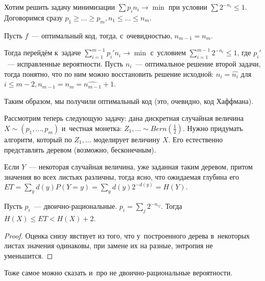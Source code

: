 \documentclass{article}
\begin{document}
Хотим решить задачу минимизации $\sum p_i n_i \rightarrow \min$ при условии
$\sum 2^{-n_i} \le 1$. Договоримся сразу $p_1 \ge \ldots \ge p_m, n_1 \le \ldots
\le n_m$.

\begin{claim}
	Пусть $f$~--- оптимальный код, тогда, с~очевидностью, $n_{m-1} = n_m$.
\end{claim}

Тогда перейдём к~задаче $\sum\limits_{i=1}^{m-1} p_i' {n_i} \rightarrow \min$
с~условием $\sum\limits_{i=1}^{m-1} 2^{-n_i} \le 1$, где $p_i'$~--- исправленные
вероятности. Пусть $\hat{n_i}$~--- оптимальное решение второй задачи, тогда
понятно, что по ним можно восстановить решение исходной: $n_i = \hat{n_i}$ для
$i \le m - 2, n_{m-1} = n_m = \hat{n_{m-1}} + 1$.

Таким образом, мы получили оптимальный код (это, очевидно, код Хаффмана).

Рассмотрим теперь следующую задачу: дана дискретная случайная величина $X \sim
(p_1, \ldots, p_m)$ и~честная монетка: $Z_1, \ldots \sim
Bern\left(\frac{1}{2}\right)$. Нужно придумать алгоритм, который по $Z_1,
\ldots$ моделирует величину $X$. Его естественно представлять деревом (возможно,
бесконечным).

Если $Y$~--- некоторая случайная величина, уже заданная таким деревом, притом
значения во всех листьях различны, тогда ясно, что ожидаемая глубина его
$ET = \sum\limits_{y} d(y) P(Y = y) = \sum\limits_{y} d(y) 2^{-d(y)} = H(Y)$.

\begin{claim}
	Пусть $p_i$~--- двоично-рациональные. $p_i = \sum\limits_j 2^{-n_{ij}}$. Тогда
	$H(X) \le ET < H(X) + 2$.
\end{claim}
\begin{proof}
	Оценка снизу явствует из того, что у~построенного дерева в~некоторых листах
	значения одинаковы, при замене их на разные, энтропия не уменьшится.
\end{proof}

Тоже самое можно сказать и~про не двоично-рациональные вероятности.
\end{document}

